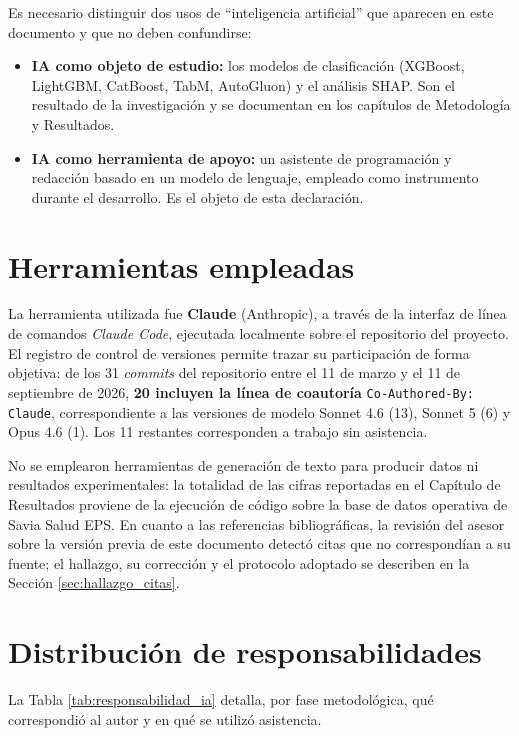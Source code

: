 \documentclass[12pt,letterpaper]{report}
\begin{document}
Es necesario distinguir dos usos de ``inteligencia artificial'' que aparecen en este
documento y que no deben confundirse:

\begin{itemize}
    \item \textbf{IA como objeto de estudio:} los modelos de clasificación
    (XGBoost, LightGBM, CatBoost, TabM, AutoGluon) y el análisis SHAP. Son el
    resultado de la investigación y se documentan en los capítulos de Metodología y
    Resultados.
    \item \textbf{IA como herramienta de apoyo:} un asistente de programación y
    redacción basado en un modelo de lenguaje, empleado como instrumento durante el
    desarrollo. Es el objeto de esta declaración.
\end{itemize}

\section{Herramientas empleadas}

La herramienta utilizada fue \textbf{Claude} (Anthropic), a través de la interfaz de
línea de comandos \textit{Claude Code}, ejecutada localmente sobre el repositorio del
proyecto. El registro de control de versiones permite trazar su participación de forma
objetiva: de los 31 \textit{commits} del repositorio entre el 11 de marzo y el 11 de
septiembre de 2026, \textbf{20 incluyen la línea de coautoría} \texttt{Co-Authored-By:
Claude}, correspondiente a las versiones de modelo Sonnet 4.6 (13), Sonnet 5 (6) y
Opus 4.6 (1). Los 11 restantes corresponden a trabajo sin asistencia.

No se emplearon herramientas de generación de texto para producir datos ni resultados
experimentales: la totalidad de las cifras reportadas en el Capítulo de Resultados
proviene de la ejecución de código sobre la base de datos operativa de Savia Salud EPS.
En cuanto a las referencias bibliográficas, la revisión del asesor sobre la versión
previa de este documento detectó citas que no correspondían a su fuente; el hallazgo,
su corrección y el protocolo adoptado se describen en la
Sección \ref{sec:hallazgo_citas}.

\section{Distribución de responsabilidades}

La Tabla \ref{tab:responsabilidad_ia} detalla, por fase metodológica, qué correspondió
al autor y en qué se utilizó asistencia.
\end{document}

